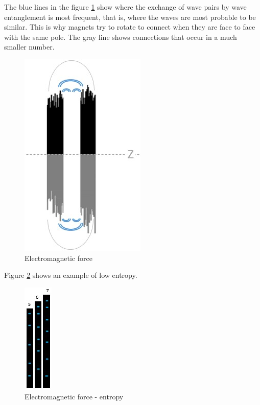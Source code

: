 The blue lines in the figure \ref{fig:consciousness_electromaagnetic_force} show where the exchange of wave pairs by wave entanglement is most frequent, that is, where the waves are most probable to be similar. This is why magnets try to rotate to connect when they are face to face with the same pole. The gray line shows connections that occur in a much smaller number.
	\begin{figure}[H]
	\caption{Electromagnetic force}
	\label{fig:consciousness_electromaagnetic_force}
	\centering
	\includegraphics[scale=.7]{sections/images/consciousness_electromaagnetic_force.jpg}
	\end{figure}

Figure \ref{fig:consciousness_electromaagnetic_force_entropy} shows an example of low entropy.
	\begin{figure}[H]
	\caption{Electromagnetic force - entropy}
	\label{fig:consciousness_electromaagnetic_force_entropy}
	\centering
	\includegraphics[scale=.9]{sections/images/consciousness_electromaagnetic_force_entropy.jpg}
	\end{figure}

